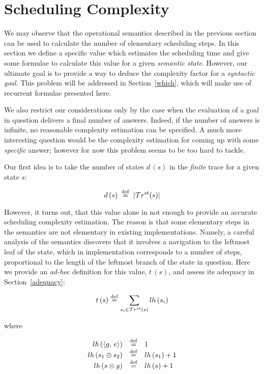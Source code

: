 \section{Scheduling Complexity}
\label{sec:scheduling}

We may observe that the operational semantics described in the previous section can be used to calculate the number of elementary scheduling steps.
In this section we define a specific value which estimates the scheduling time and give some formulae to calculate this value for a given \emph{semantic
state}. However, our ultimate goal is to provide a way to deduce the complexity factor for a \emph{syntactic goal}. This problem will be addressed in
Section~\ref{which}, which will make use of recurrent formulae presented here.

We also restrict our considerations only by the case when the evaluation of a goal in question delivers a final number of answers. Indeed,
if the number of answers is infinite, no reasonable complexity estimation can be specified. A much more interesting question would be
the complexity estimation for coming up with some \emph{specific} answer; however for now this problem seems to be too hard to
tackle.

Our first idea is to take the number of states $d\,(s)$ in the \emph{finite} trace for a given state $s$:

\[ d\,(s) \; \overset{\mathrm{def}}{=} \; | \mathcal{T}r^{st}(s) |  \]

However, it turns out, that this value alone in not enough to provide an accurate scheduling complexity estimation. The reason is that some
elementary steps in the semantics are not elementary in existing implementations. Namely, a careful analysis of the semantics discovers that
it involves a navigation to the leftmost leaf of the state, which in implementation corresponds to a number of
steps, proportional to the length of the leftmost branch of the state in question. Here we provide an \emph{ad-hoc} definition for this value, $t\,(s)$, and
assess its adequacy in Section~\ref{adequacy}:

\[
t\,(s) \overset{\mathrm{def}}{=} \sum\limits_{s_i \in \mathcal{T}r^{st}(s)} lh\,(s_i) 
\]

where

\[
\begin{array}{rcl}
 lh\,(\langle g ,\, e \rangle)  &\overset{\mathrm{def}}{=}& 1 \\
 lh\,(s_1 \oplus s_2) &\overset{\mathrm{def}}{=}& lh\,(s_1) + 1 \\
 lh\,(s \otimes g)    &\overset{\mathrm{def}}{=}& lh\,(s) + 1 \\
\end{array}
\]

